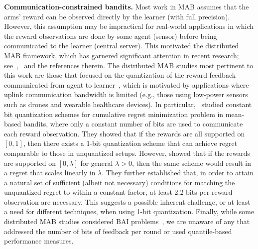 \textbf{Communication-constrained bandits.}
Most work in MAB assumes that the arms' reward can be observed directly by the learner (with full precision).
However, this assumption may be impractical for real-world applications in which the reward observations are done by some agent (sensor) before being communicated to the learner (central server). 
This motivated the distributed MAB framework, which has garnered significant attention in recent research; see~\cite{amani2023distributed},~\cite[Appendix A]{salgia2023distributed} and the references therein.
The distributed MAB studies most pertinent to this work are those that focused on the quantization of the reward feedback communicated from agent to learner~\cite{vial2020one, hanna2022solving, mitra2023linear, mayekar2023communication}, which is motivated by applications where uplink communication bandwidth is limited (e.g., those using low-power sensors such as drones and wearable healthcare devices).
In particular,~\cite{vial2020one, hanna2022solving} studied constant bit
quantization schemes for
cumulative regret minimization problem in mean-based bandits, where only a constant number of bits are used to communicate each reward observation.
They showed that if the rewards are all supported on $[0, 1]$, then there exists a 1-bit quantization scheme that can achieve 
regret comparable to those in unquantized setups.
However, \cite[Sec. 3]{hanna2022solving} showed that if the rewards are supported on $[0, \lambda]$ for general $\lambda > 0$, then the same scheme would result in a regret that scales linearly in $\lambda$.
They further established that, in order to attain a natural set of sufficient (albeit not necessary) conditions for matching the unquantized regret to within a constant factor, at least 2.2 bits per reward observation are necessary.  
This suggests a possible inherent challenge, or at least a need for different techniques, when using 1-bit quantization.  
Finally, while some distributed MAB studies considered BAI problems~\cite{hillel2013distributed, karnin2013almost, tao2019collaborative, reda2022nearoptimal}, we are unaware of any that addressed the number of bits of feedback per round or used quantile-based performance measures.